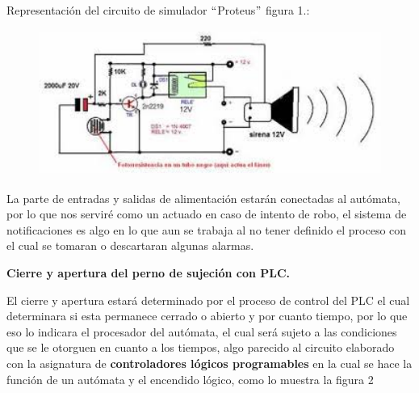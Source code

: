 \documentclass[12pt]{article}
\begin{document}
\vspace{\baselineskip}
{\fontsize{11pt}{13.2pt}\selectfont Representación del circuito de simulador $``$Proteus$"$  figura 1.:\par}\par


\vspace{\baselineskip}



\begin{figure}[H]
	\begin{Center}
		\includegraphics[width=5.06in,height=1.88in]{./media/image9.png}
	\end{Center}
\end{figure}



\par


\vspace{\baselineskip}

\vspace{\baselineskip}
{\fontsize{11pt}{13.2pt}\selectfont La parte de entradas y salidas de alimentación estarán conectadas al autómata, por lo que nos serviré como un actuado en caso de intento de robo, el sistema de notificaciones es algo en lo que aun se trabaja al no tener definido el proceso con el cual se tomaran o descartaran algunas alarmas.\par}\par


\vspace{\baselineskip}
{\fontsize{11pt}{13.2pt}\selectfont \textbf{Cierre y apertura del perno de sujeción con PLC.}\par}\par


\vspace{\baselineskip}
{\fontsize{11pt}{13.2pt}\selectfont El cierre y apertura estará determinado por el proceso de control del PLC el cual determinara si esta permanece cerrado o abierto y por cuanto tiempo, por lo que eso lo indicara el procesador del autómata, el cual será sujeto a las condiciones que se le otorguen en cuanto a los tiempos, algo parecido al circuito elaborado con la asignatura de \textbf{controladores lógicos programables }en la cual se hace la función de un autómata y el encendido lógico, como lo muestra la figura 2\par}\par
\end{document}

